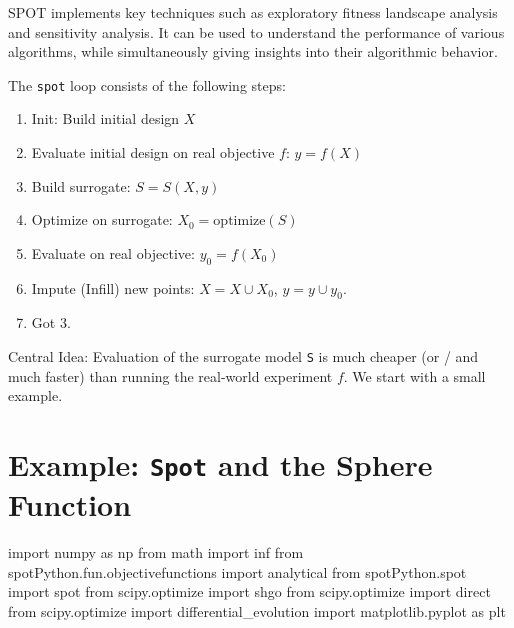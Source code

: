 \documentclass[
  letterpaper,
  DIV=11,
  numbers=noendperiod]{scrreprt}
\newenvironment{Shaded}{\begin{snugshade}}{\end{snugshade}}
\newcommand{\ImportTok}[1]{\textcolor[rgb]{0.00,0.46,0.62}{#1}}
\newcommand{\NormalTok}[1]{\textcolor[rgb]{0.00,0.23,0.31}{#1}}
\providecommand{\tightlist}{%
  \setlength{\itemsep}{0pt}\setlength{\parskip}{0pt}}\usepackage{longtable,booktabs,array}
\begin{document}
SPOT implements key techniques such as exploratory fitness landscape
analysis and sensitivity analysis. It can be used to understand the
performance of various algorithms, while simultaneously giving insights
into their algorithmic behavior.

The \texttt{spot} loop consists of the following steps:

\begin{enumerate}
\def\labelenumi{\arabic{enumi}.}
\tightlist
\item
  Init: Build initial design \(X\)
\item
  Evaluate initial design on real objective \(f\): \(y = f(X)\)
\item
  Build surrogate: \(S = S(X,y)\)
\item
  Optimize on surrogate: \(X_0 = \text{optimize}(S)\)
\item
  Evaluate on real objective: \(y_0 = f(X_0)\)
\item
  Impute (Infill) new points: \(X = X \cup X_0\), \(y = y \cup y_0\).
\item
  Got 3.
\end{enumerate}

Central Idea: Evaluation of the surrogate model \texttt{S} is much
cheaper (or / and much faster) than running the real-world experiment
\(f\). We start with a small example.

\hypertarget{example-spot-and-the-sphere-function}{%
\section{\texorpdfstring{Example: \texttt{Spot} and the Sphere
Function}{Example: Spot and the Sphere Function}}\label{example-spot-and-the-sphere-function}}

\begin{Shaded}
\begin{Highlighting}[]
\ImportTok{import}\NormalTok{ numpy }\ImportTok{as}\NormalTok{ np}
\ImportTok{from}\NormalTok{ math }\ImportTok{import}\NormalTok{ inf}
\ImportTok{from}\NormalTok{ spotPython.fun.objectivefunctions }\ImportTok{import}\NormalTok{ analytical}
\ImportTok{from}\NormalTok{ spotPython.spot }\ImportTok{import}\NormalTok{ spot}
\ImportTok{from}\NormalTok{ scipy.optimize }\ImportTok{import}\NormalTok{ shgo}
\ImportTok{from}\NormalTok{ scipy.optimize }\ImportTok{import}\NormalTok{ direct}
\ImportTok{from}\NormalTok{ scipy.optimize }\ImportTok{import}\NormalTok{ differential\_evolution}
\ImportTok{import}\NormalTok{ matplotlib.pyplot }\ImportTok{as}\NormalTok{ plt}
\end{Highlighting}
\end{Shaded}
\end{document}
